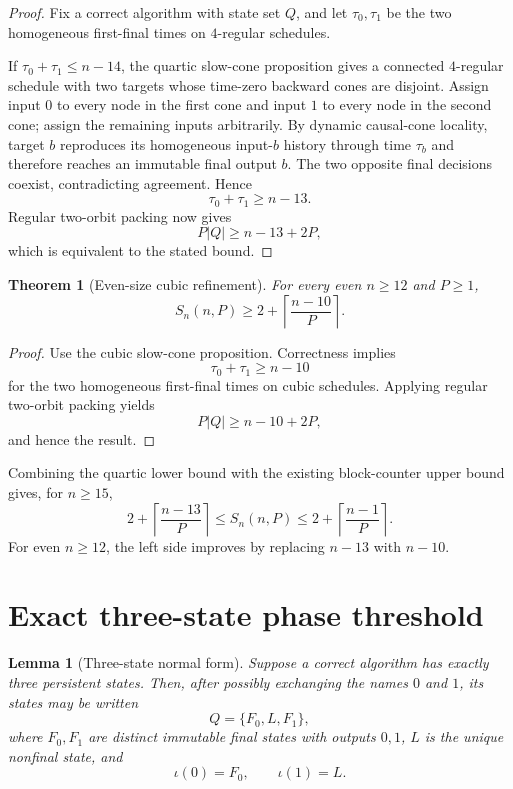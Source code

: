 \documentclass[11pt]{article}
\newtheorem{theorem}{Theorem}
\newtheorem{lemma}{Lemma}
\theoremstyle{remark}
\newcommand{\Fzero}{F_0}
\newcommand{\Fone}{F_1}
\newcommand{\Live}{L}
\begin{document}
\begin{proof}
Fix a correct algorithm with state set $Q$, and let $\tau_0,\tau_1$ be the two
homogeneous first-final times on $4$-regular schedules.

If $\tau_0+\tau_1\le n-14$, the quartic slow-cone proposition gives a connected
$4$-regular schedule with two targets whose time-zero backward cones are disjoint.
Assign input $0$ to every node in the first cone and input $1$ to every node in
the second cone; assign the remaining inputs arbitrarily.  By dynamic causal-cone
locality, target $b$ reproduces its homogeneous input-$b$ history through time
$\tau_b$ and therefore reaches an immutable final output $b$.  The two opposite
final decisions coexist, contradicting agreement.  Hence
\[
\tau_0+\tau_1\ge n-13.
\]
Regular two-orbit packing now gives
\[
P|Q|\ge n-13+2P,
\]
which is equivalent to the stated bound.
\end{proof}

\begin{theorem}[Even-size cubic refinement]
For every even $n\ge12$ and $P\ge1$,
\[
\boxed{
S_n(n,P)\ge
2+\left\lceil\frac{n-10}{P}\right\rceil.
}
\]
\end{theorem}

\begin{proof}
Use the cubic slow-cone proposition.  Correctness implies
\[
\tau_0+\tau_1\ge n-10
\]
for the two homogeneous first-final times on cubic schedules.  Applying regular
two-orbit packing yields
\[
P|Q|\ge n-10+2P,
\]
and hence the result.
\end{proof}

Combining the quartic lower bound with the existing block-counter upper bound gives,
for $n\ge15$,
\[
2+\left\lceil\frac{n-13}{P}\right\rceil
\le S_n(n,P)\le
2+\left\lceil\frac{n-1}{P}\right\rceil.
\]
For even $n\ge12$, the left side improves by replacing $n-13$ with $n-10$.

\section{Exact three-state phase threshold}

\begin{lemma}[Three-state normal form]
Suppose a correct algorithm has exactly three persistent states.  Then, after
possibly exchanging the names $0$ and $1$, its states may be written
\[
Q=\{\Fzero,\Live,\Fone\},
\]
where $\Fzero,\Fone$ are distinct immutable final states with outputs $0,1$,
$\Live$ is the unique nonfinal state, and
\[
\iota(0)=\Fzero,\qquad \iota(1)=\Live.
\]
\end{lemma}
\end{document}
